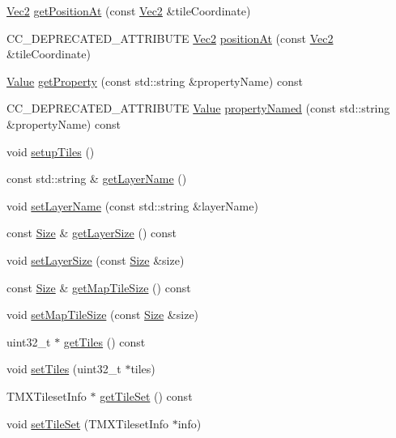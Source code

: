 \begin{DoxyCompactItemize}
\hyperlink{classVec2}{Vec2} \hyperlink{classTMXLayer_a3b433e1831ed12ae032db0124f286470}{get\+Position\+At} (const \hyperlink{classVec2}{Vec2} \&tile\+Coordinate)
\item 
C\+C\+\_\+\+D\+E\+P\+R\+E\+C\+A\+T\+E\+D\+\_\+\+A\+T\+T\+R\+I\+B\+U\+TE \hyperlink{classVec2}{Vec2} \hyperlink{classTMXLayer_aac322f83e04e9efa5cb88b49d034b9f0}{position\+At} (const \hyperlink{classVec2}{Vec2} \&tile\+Coordinate)
\item 
\hyperlink{classValue}{Value} \hyperlink{classTMXLayer_a6ed296d4b13f396f00815266c74054ff}{get\+Property} (const std\+::string \&property\+Name) const
\item 
C\+C\+\_\+\+D\+E\+P\+R\+E\+C\+A\+T\+E\+D\+\_\+\+A\+T\+T\+R\+I\+B\+U\+TE \hyperlink{classValue}{Value} \hyperlink{classTMXLayer_af6fefaddaa8d6208b1d375f08e6d3ad6}{property\+Named} (const std\+::string \&property\+Name) const
\item 
void \hyperlink{classTMXLayer_acf9d1ea932daf85d00dce917e40049b7}{setup\+Tiles} ()
\item 
const std\+::string \& \hyperlink{classTMXLayer_a83d5647317c7be079f5034530ec1eaab}{get\+Layer\+Name} ()
\item 
void \hyperlink{classTMXLayer_a41ce08785e388b65e0f994781f45183d}{set\+Layer\+Name} (const std\+::string \&layer\+Name)
\item 
const \hyperlink{classSize}{Size} \& \hyperlink{classTMXLayer_a33aa146a907ade5080f67817ee8f552d}{get\+Layer\+Size} () const
\item 
void \hyperlink{classTMXLayer_a4967459155b855cfa403d2fbb4b6f7c1}{set\+Layer\+Size} (const \hyperlink{classSize}{Size} \&size)
\item 
const \hyperlink{classSize}{Size} \& \hyperlink{classTMXLayer_acb38799b0ca66198f06c9b451b469118}{get\+Map\+Tile\+Size} () const
\item 
void \hyperlink{classTMXLayer_aefb7200c533405f89265e1c1cf1c7314}{set\+Map\+Tile\+Size} (const \hyperlink{classSize}{Size} \&size)
\item 
uint32\+\_\+t $\ast$ \hyperlink{classTMXLayer_a99a6fdaff73922809a3b2edbeb6d15e8}{get\+Tiles} () const
\item 
void \hyperlink{classTMXLayer_a5697a3402af12c2cd53ed67e344e5847}{set\+Tiles} (uint32\+\_\+t $\ast$tiles)
\item 
T\+M\+X\+Tileset\+Info $\ast$ \hyperlink{classTMXLayer_a2f1133ee7af2fa00682c68b5bca6541b}{get\+Tile\+Set} () const
\item 
void \hyperlink{classTMXLayer_a97b14b1c69b6bdc5e5fd2b6e99605263}{set\+Tile\+Set} (T\+M\+X\+Tileset\+Info $\ast$info)

\end{DoxyCompactItemize}

